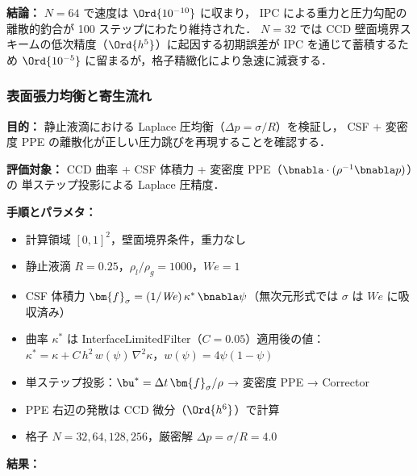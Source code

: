 \noindent\textbf{結論：}
$N = 64$ で速度は $\Ord{10^{-10}}$ に収まり，
IPC による重力と圧力勾配の離散的釣合が 100 ステップにわたり維持された．
$N = 32$ では CCD 壁面境界スキームの低次精度（$\Ord{h^5}$）に起因する初期誤差が IPC を通じて蓄積するため
$\Ord{10^{-5}}$ に留まるが，格子精緻化により急速に減衰する．

\subsubsection{表面張力均衡と寄生流れ}
\label{sec:bf_static_droplet}

\noindent\textbf{目的：}
静止液滴における Laplace 圧均衡（$\Delta p = \sigma/R$）を検証し，
CSF + 変密度 PPE の離散化が正しい圧力跳びを再現することを確認する．

\noindent\textbf{評価対象：}
CCD 曲率 + CSF 体積力 + 変密度 PPE（$\bnabla\cdot({\rho^{-1}}\bnabla p)$）の
単ステップ投影による Laplace 圧精度．

\noindent\textbf{手順とパラメタ：}
\begin{itemize}[noitemsep]
  \item 計算領域 $[0,1]^2$，壁面境界条件，重力なし
  \item 静止液滴 $R = 0.25$，$\rho_l/\rho_g = 1000$，$\mathit{We} = 1$
  \item CSF 体積力 $\bm{f}_\sigma = (1/\mathit{We})\,\kappa^*\,\bnabla\psi$（無次元形式では $\sigma$ は $We$ に吸収済み）
  \item 曲率 $\kappa^*$ は InterfaceLimitedFilter（$C = 0.05$）適用後の値：
        $\kappa^* = \kappa + C\,h^2\,w(\psi)\,\nabla^2\kappa$，$w(\psi) = 4\psi(1-\psi)$
  \item 単ステップ投影：$\bu^* = \Delta t\,\bm{f}_\sigma / \rho$ → 変密度 PPE → Corrector
  \item PPE 右辺の発散は CCD 微分（$\Ord{h^6}$）で計算
  \item 格子 $N = 32, 64, 128, 256$，厳密解 $\Delta p = \sigma / R = 4.0$
\end{itemize}

\noindent\textbf{結果：}

